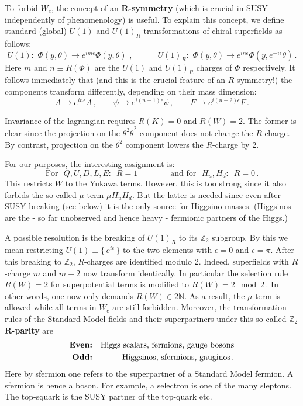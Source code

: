 \documentclass[12pt]{article}
\newcommand{\be}{\begin{equation}}
\newcommand{\ee}{\end{equation}}
\newcommand{\bea}{\begin{eqnarray}}
\newcommand{\eea}{\end{eqnarray}}
\newcommand{\ol}{\overline}
\numberwithin{equation}{section}
\begin{document}
To forbid $W_e$, the concept of an {\bf $\bm R$-symmetry} (which is crucial in SUSY independently of phenomenology) is useful. To explain this concept, we define standard (global) $U(1)$ and $U(1)_R$ transformations of chiral superfields as follows:
\be
U(1):\,\,\Phi(y,\theta)\to e^{im\epsilon}\Phi(y,\theta)\,\,,\qquad \quad
U(1)_R:\,\,\Phi(y,\theta)\to e^{in\epsilon}\Phi(y,e^{-i\epsilon}\theta)\,.
\ee
Here $m$ and $n\equiv R(\Phi)$ are the $U(1)$ and $U(1)_R$ charges of $\Phi$ respectively. It follows immediately that (and this is the crucial feature of an $R$-symmetry!) the components transform differently, depending on their mass dimension:
\be
A\to e^{in\epsilon}A\,,\qquad \psi\to e^{i(n-1)\epsilon}\psi\,,\qquad
F\to e^{i(n-2)\epsilon}F\,.
\ee

Invariance of the lagrangian requires $R(K)=0$ and $R(W)=2$. The former is clear since the projection on the $\theta^2\ol{\theta}^2$ component does not change the $R$-charge. By contrast, projection on the $\theta^2$ component lowers the $R$-charge by 2. 

For our purposes, the interesting assignment is:
\be
\mbox{For}\,\,\,\,Q,U,D,L,E:\,\,\,R=1\qquad\qquad\mbox{and for}\,\,\,\,H_u,H_d:\,\,\,R=0\,.
\ee
This restricts $W$ to the Yukawa terms. However, this is too strong since it also forbids the so-called $\mu$ term $\mu H_u H_d$. But the latter is needed since even after SUSY breaking (see below) it is the only source for Higgsino masses. (Higgsinos are the - so far unobserved and hence heavy - fermionic partners of the Higgs.) 

A possible resolution is the breaking of $U(1)_R$ to its $\mathbb{Z}_2$ subgroup. By this we mean restricting $U(1)\equiv\{\,e^{i\epsilon}\,\}$ to the two elements with $\epsilon=0$ and $\epsilon=\pi$. After this breaking to $\mathbb{Z}_2$, $R$-charges are identified modulo 2. Indeed, superfields with $R$-charge $m$ and $m+2$ now transform identically. In particular the selection rule $R(W)=2$ for superpotential terms is modified to $\mbox{$R(W)=2\!\mod{2}\,$}$. In other words, one now only demands $R(W)\in 2\mathbb{N}$. As a result, the $\mu$ term is allowed while all terms in $W_e$ are still forbidden. Moreover, the transformation rules of the Standard Model fields and their superpartners under this so-called {\bf $\mathbb{Z}_2$ $\bm R$-parity} are
\bea
\mbox{\bf Even:}&&\mbox{Higgs scalars, fermions, gauge bosons}
\\
\mbox{\bf Odd:}&&\mbox{Higgsinos, sfermions, gauginos}\,.
\eea
Here by sfermion one refers to the superpartner of a Standard Model fermion. A sfermion is hence a boson. For example, a selectron is one of the many sleptons. The top-squark is the SUSY partner of the top-quark etc.
\end{document}
